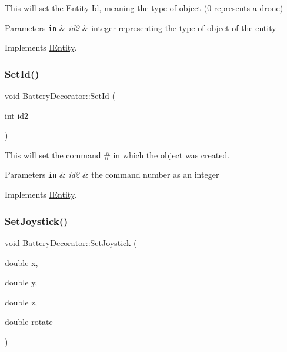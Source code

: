 This will set the \hyperlink{classEntity}{Entity} Id, meaning the type of object (0 represents a drone) 


\begin{DoxyParams}[1]{Parameters}
\mbox{\tt in}  & {\em id2} & integer representing the type of object of the entity \\
\hline
\end{DoxyParams}


Implements \hyperlink{classIEntity_a3a830862181cb0548d2aca83d908263e}{I\+Entity}.

\mbox{\label{classBatteryDecorator_aafe8d17f609556cfcb5537e38adc66f2}} 
\subsubsection{\texorpdfstring{Set\+Id()}{SetId()}}
{\footnotesize\ttfamily void Battery\+Decorator\+::\+Set\+Id (\begin{DoxyParamCaption}\item[{int}]{id2 }\end{DoxyParamCaption})\hspace{0.3cm}{\ttfamily [virtual]}}



This will set the command \# in which the object was created. 


\begin{DoxyParams}[1]{Parameters}
\mbox{\tt in}  & {\em id2} & the command number as an integer \\
\hline
\end{DoxyParams}


Implements \hyperlink{classIEntity_a8c6af682e07f569ba2f164d214295c67}{I\+Entity}.

\mbox{\label{classBatteryDecorator_abb1ece4f26ac33daefd53a56180721eb}} 
\subsubsection{\texorpdfstring{Set\+Joystick()}{SetJoystick()}}
{\footnotesize\ttfamily void Battery\+Decorator\+::\+Set\+Joystick (\begin{DoxyParamCaption}\item[{double}]{x,  }\item[{double}]{y,  }\item[{double}]{z,  }\item[{double}]{rotate }\end{DoxyParamCaption})\hspace{0.3cm}{\ttfamily [virtual]}}



